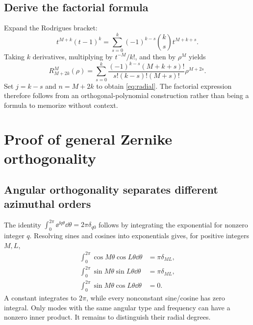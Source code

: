 \subsection{Derive the factorial formula}
Expand the Rodrigues bracket:
\begin{equation}
t^{M+k}(t-1)^k=\sum_{s=0}^k(-1)^{k-s}\binom{k}{s}t^{M+k+s}.
\end{equation}
Taking $k$ derivatives, multiplying by $t^{-M}/k!$, and then by $\rho^M$ yields
\begin{equation}
R_{M+2k}^M(\rho)=\sum_{s=0}^k
\frac{(-1)^{k-s}(M+k+s)!}{s!(k-s)!(M+s)!}\rho^{M+2s}.
\end{equation}
Set $j=k-s$ and $n=M+2k$ to obtain \eqref{eq:radial}. The factorial expression therefore follows from an orthogonal-polynomial construction rather than being a formula to memorize without context.

\section{Proof of general Zernike orthogonality}
\subsection{Angular orthogonality separates different azimuthal orders}
The identity $\int_0^{2\pi}\ee^{\ii q\theta}\dd\theta=2\pi\delta_{q0}$ follows by integrating the exponential for nonzero integer $q$. Resolving sines and cosines into exponentials gives, for positive integers $M,L$,
\begin{align}
\int_0^{2\pi}\cos M\theta\cos L\theta\dd\theta&=\pi\delta_{ML},\\
\int_0^{2\pi}\sin M\theta\sin L\theta\dd\theta&=\pi\delta_{ML},\\
\int_0^{2\pi}\sin M\theta\cos L\theta\dd\theta&=0.
\end{align}
A constant integrates to $2\pi$, while every nonconstant sine/cosine has zero integral. Only modes with the same angular type and frequency can have a nonzero inner product. It remains to distinguish their radial degrees.

